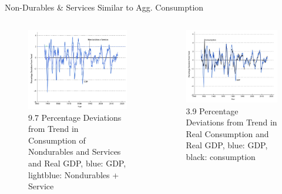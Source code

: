 \documentclass[11pt,aspectratio=169,usenames,dvipsnames]{beamer}
\begin{document}
\begin{frame}{Non-Durables \& Services Similar to Agg. Consumption}
\label{slide:Non_Durables_and_Services_Behaves_Similar_to_Agg__Consumption}
\begin{columns}
    \begin{column}{0.5\textwidth}
        \begin{figure}
            \caption{\scriptsize 9.7 Percentage Deviations from Trend in Consumption of Nondurables and Services and Real GDP, \alert{blue: GDP}, \alert{lightblue: Nondurables + Service}}
            \includegraphics[width=\textwidth]{./figures/Figure9_7.jpg}
        \end{figure}
    \end{column}
    \begin{column}{0.5\textwidth}
        \begin{figure}
            \caption{\scriptsize 3.9 Percentage Deviations from Trend in \alert{Real Consumption} and Real GDP, \alert{blue: GDP}, black: consumption}
            \includegraphics[width=\textwidth]{../Lecture_03/figures/Figure3_9.jpg}
        \end{figure}
    \end{column}
\end{columns}
\end{frame}
\end{document}
